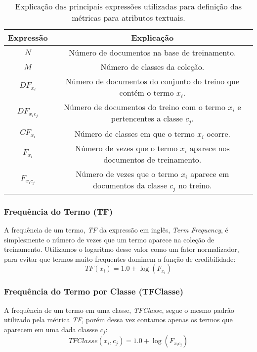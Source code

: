 \begin{table}[ht*]
\centering
\begin{tabular}{|c|c|}
\toprule
    \textbf{Expressão} & \textbf{Explicação} \\
\midrule
    $N$           & Número de documentos na base de treinamento. \tabularnewline \hline
    $M$           & Número de classes da coleção. \tabularnewline \hline
    $DF_{x_i} $   & Número de documentos do conjunto do treino que contém o termo $x_i$. \tabularnewline \hline
    $DF_{x_ic_j}$ & Número de documentos do treino com o termo $x_i$ e pertencentes a classe $c_j$. \tabularnewline \hline
    $CF_{x_i}$    & Número de classes em que o termo $x_i$ ocorre. \tabularnewline \hline 
    $F_{x_i}$     & Número de vezes que o termo $x_i$ aparece nos documentos de treinamento. \tabularnewline \hline
    $F_{x_ic_j}$  & Número de vezes que o termo $x_i$ aparece em documentos da classe $c_j$ no treino. \tabularnewline 
\bottomrule
\end{tabular}
\label{table::metricas_textuais}
\caption{Explicação das principais expressões utilizadas para definição das métricas para atributos textuais.}
\end{table}


\subsubsection{Frequência do Termo (TF)}
\label{subsubsection::sumtf}

A frequência de um termo, \textit{TF} da expressão em inglês, \textit{Term Frequency}, é simplesmente o número de vezes que um termo aparece na coleção de treinamento. Utilizamos o logaritmo desse valor como um fator normalizador, para evitar que termos muito frequentes dominem a função de credibilidade:
\begin{equation}\label{eqn::sumtf}
   TF(x_i) = 1.0 + \log{ ( F_{x_i} ) }
\end{equation}


\subsubsection{Frequência do Termo por Classe (TFClasse)}
\label{subsubsection::tf}

A frequência de um termo em uma classe, \textit{TFClasse}, segue o mesmo padrão utilizado pela métrica \textit{TF}, porém dessa vez contamos apenas os termos que aparecem em uma dada classse $c_j$:
\begin{equation}\label{eqn::tf}
   TFClasse(x_i, c_j) = 1.0 + \log{ ( F_{x_ic_j} ) }
\end{equation}


